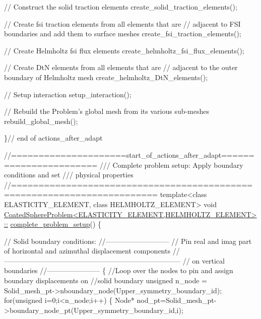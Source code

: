 \begin{DoxyCodeInclude}
{ \textcolor{comment}{// Construct the solid traction elements}
 create\_solid\_traction\_elements(); 

 \textcolor{comment}{// Create fsi traction elements from all elements that are }
 \textcolor{comment}{// adjacent to FSI boundaries and add them to surface meshes}
 create\_fsi\_traction\_elements();
 
 \textcolor{comment}{// Create Helmholtz fsi flux elements}
 create\_helmholtz\_fsi\_flux\_elements();
 
 \textcolor{comment}{// Create DtN elements from all elements that are }
 \textcolor{comment}{// adjacent to the outer boundary of Helmholtz mesh}
 create\_helmholtz\_DtN\_elements();
   
 \textcolor{comment}{// Setup interaction}
 setup\_interaction();
 
 \textcolor{comment}{// Rebuild the Problem's global mesh from its various sub-meshes}
 rebuild\_global\_mesh();
 
\}\textcolor{comment}{// end of actions\_after\_adapt}



\textcolor{comment}{//=====================start\_of\_actions\_after\_adapt=======================}\textcolor{comment}{}
\textcolor{comment}{/// Complete problem setup: Apply boundary conditions and set}
\textcolor{comment}{/// physical properties}
\textcolor{comment}{}\textcolor{comment}{//========================================================================}
\textcolor{keyword}{template}<\textcolor{keyword}{class} ELASTICITY\_ELEMENT, \textcolor{keyword}{class} HELMHOLTZ\_ELEMENT>
\textcolor{keywordtype}{void} \hyperlink{classCoatedSphereProblem_a7417ba994216c3d817259891176cd392}{CoatedSphereProblem<ELASTICITY\_ELEMENT,HELMHOLTZ\_ELEMENT>::}
\hyperlink{classCoatedSphereProblem_a7417ba994216c3d817259891176cd392}{complete\_problem\_setup}()
\{

 \textcolor{comment}{// Solid boundary conditions:}
 \textcolor{comment}{//---------------------------}
 \textcolor{comment}{// Pin real and imag part of horizontal and azimuthal displacement components }
 \textcolor{comment}{//---------------------------------------------------------------------------}
 \textcolor{comment}{// on vertical boundaries}
 \textcolor{comment}{//-----------------------}
 \{  
  \textcolor{comment}{//Loop over the nodes to pin and assign boundary displacements on }
  \textcolor{comment}{//solid boundary}
  \textcolor{keywordtype}{unsigned} n\_node = Solid\_mesh\_pt->nboundary\_node(Upper\_symmetry\_boundary\_id);
  \textcolor{keywordflow}{for}(\textcolor{keywordtype}{unsigned} i=0;i<n\_node;i++)
   \{
    Node* nod\_pt=Solid\_mesh\_pt->boundary\_node\_pt(Upper\_symmetry\_boundary\_id,i);
    
}
\end{DoxyCodeInclude}
